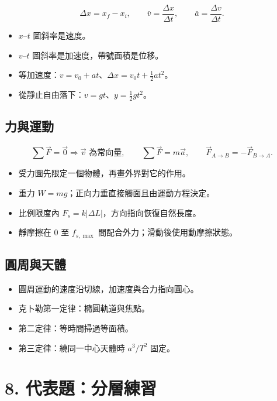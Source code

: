 \documentclass[11pt,a4paper]{article}
\providecommand{\tightlist}{%
  \setlength{\itemsep}{0pt}\setlength{\parskip}{0pt}}
\begin{document}
\[
\Delta x=x_f-x_i,
\qquad
\bar v=\frac{\Delta x}{\Delta t},
\qquad
\bar a=\frac{\Delta v}{\Delta t}.
\]

\begin{itemize}
\tightlist
\item
  \(x\)--\(t\) 圖斜率是速度。
\item
  \(v\)--\(t\) 圖斜率是加速度，帶號面積是位移。
\item
  等加速度：\(v=v_0+at\)、\(\Delta x=v_0t+\frac{1}{2}at^2\)。
\item
  從靜止自由落下：\(v=gt\)、\(y=\frac{1}{2}gt^2\)。
\end{itemize}

\subsection{力與運動}\label{ux529bux8207ux904bux52d5}

\[
\sum\vec F=\vec0\Rightarrow\vec v\text{ 為常向量},
\qquad
\sum\vec F=m\vec a,
\qquad
\vec F_{A\to B}=-\vec F_{B\to A}.
\]

\begin{itemize}
\tightlist
\item
  受力圖先限定一個物體，再畫外界對它的作用。
\item
  重力 \(W=mg\)；正向力垂直接觸面且由運動方程決定。
\item
  比例限度內 \(F_s=k|\Delta L|\)，方向指向恢復自然長度。
\item
  靜摩擦在 \(0\) 至 \(f_{s,\max}\) 間配合外力；滑動後使用動摩擦狀態。
\end{itemize}

\subsection{圓周與天體}\label{ux5713ux5468ux8207ux5929ux9ad4}

\begin{itemize}
\tightlist
\item
  圓周運動的速度沿切線，加速度與合力指向圓心。
\item
  克卜勒第一定律：橢圓軌道與焦點。
\item
  第二定律：等時間掃過等面積。
\item
  第三定律：繞同一中心天體時 \(a^3/T^2\) 固定。
\end{itemize}

\section{8. 代表題：分層練習}\label{ux4ee3ux8868ux984cux5206ux5c64ux7df4ux7fd2}
\end{document}
